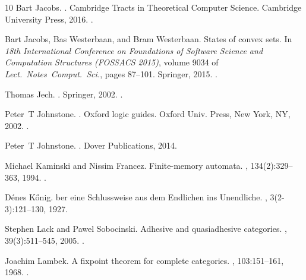 \documentclass[10pt,a4paper]{article}
\theoremstyle{definition}
\theoremstyle{remark}
\numberwithin{equation}{section}
\theoremstyle{plain}
\theoremstyle{definition}
\begin{document}
\begin{thebibliography}{10}
Bart Jacobs.
.
\newblock Cambridge Tracts in Theoretical Computer Science. Cambridge
  University Press, 2016.
\newblock \href {https://doi.org/10.1017/CBO9781316823187}
  {}.

Bart Jacobs, Bas Westerbaan, and Bram Westerbaan.
\newblock States of convex sets.
\newblock In {\em 18th International Conference on Foundations of Software
  Science and Computation Structures (FOSSACS 2015)}, volume 9034 of {\em
  Lect.~Notes~Comput.~Sci.}, pages 87--101. Springer, 2015.
\newblock \href {https://doi.org/10.1007/978-3-662-46678-0_6}
  {}.

Thomas Jech.
.
\newblock Springer, 2002.
\newblock \href {https://doi.org/10.1007/3-540-44761-X}
  {}.

Peter~T Johnstone.
.
\newblock Oxford logic guides. Oxford Univ. Press, New York, NY, 2002.
\newblock \href {https://doi.org/10.1017/S1079898600003462}
  {}.

Peter~T Johnstone.
.
\newblock Dover Publications, 2014.

Michael Kaminski and Nissim Francez.
\newblock Finite-memory automata.
, 134(2):329--363, 1994.
\newblock \href {https://doi.org/10.1016/0304-3975(94)90242-9}
  {}.

D{\'e}nes K\H{o}nig.
ber eine {S}chlussweise aus dem {E}ndlichen ins {U}nendliche.
, 3(2-3):121--130, 1927.

Stephen Lack and Pawel Sobocinski.
\newblock Adhesive and quasiadhesive categories.
, 39(3):511--545, 2005.
\newblock \href {https://doi.org/10.1051/ITA:2005028}
  {}.

Joachim Lambek.
\newblock A fixpoint theorem for complete categories.
, 103:151--161, 1968.
\newblock \href {https://doi.org/10.1007/BF01110627}
  {}.


\end{thebibliography}
\end{document}
